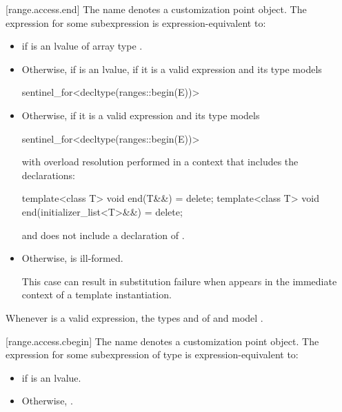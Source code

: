 [range.access.end]{}
\pnum
The name  denotes a customization point
object. The expression
 for some subexpression  is
expression-equivalent to:
\begin{itemize}
\item
   if  is an lvalue of array
  type .

\item
  Otherwise, if  is an lvalue,
  if it is a valid expression and its type  models
  \begin{codeblock}
sentinel_for<decltype(ranges::begin(E))>
  \end{codeblock}

\item
  Otherwise,  if it is a valid
  expression and its type  models
  \begin{codeblock}
sentinel_for<decltype(ranges::begin(E))>
  \end{codeblock}
  with overload
  resolution performed in a context that includes the declarations:
  \begin{codeblock}
template<class T> void end(T&&) = delete;
template<class T> void end(initializer_list<T>&&) = delete;
  \end{codeblock}
  and does not include a declaration of .

\item
  Otherwise,  is ill-formed.
  \begin{note}
  This case can result in substitution failure when 
  appears in the immediate context of a template instantiation.
  \end{note}
\end{itemize}

\pnum
\begin{note}
Whenever  is a valid expression,
the types  and  of
 and 
model .
\end{note}

[range.access.cbegin]{}
\pnum
The name  denotes a customization point
object. The expression
 for some subexpression  of type 
is expression-equivalent to:
\begin{itemize}
\item {} if  is an lvalue.
\item Otherwise, .
\end{itemize}

